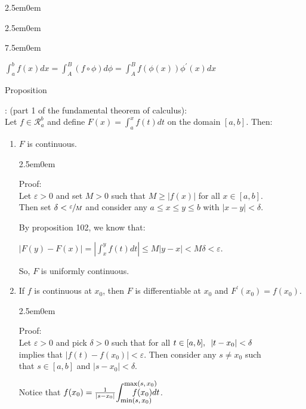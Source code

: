 \documentclass{book}
\newcommand{\hThree}{%
   \color{PineGreen!85!Orange}
   \fontsize{13}{15}\selectfont%
}
\newenvironment{myIndent}{%
   \begin{adjustwidth}{2.5em}{0em}%
}{%
   \end{adjustwidth}%
}
\newenvironment{myTindent}{%
   \begin{adjustwidth}{7.5em}{0em}%
}{%
   \end{adjustwidth}%
}
\newcommand{\myHS}{ \hspace{0.5em}}
\newcounter{PropNumber}
\newcommand{\propCount}[1][1]{%
   \addtocounter{PropNumber}{#1}%
   \thePropNumber%
}
\newcommand{\retTwo}{\hfill\bigbreak}
\begin{document}
{\begin{myIndent}
{\begin{myIndent}
{\begin{myTindent}
         {\centering $\int_a^bf(x)dx = \int_A^B(f \circ \phi)d\phi = \int_A^B f(\phi(x))\phi^\prime(x)dx$ \retTwo\par}
      \end{myTindent}}
   \end{myIndent}}

   Proposition \propCount: (part 1 of the fundamental theorem of calculus):\\
   Let $f \in \mathscr{R}_a^b$ and define $F(x) = \int_a^xf(t)dt$ on the domain $[a, b]$. Then:
   \begin{enumerate}
      \item $F$ is continuous.
      
      {\begin{myIndent}\hThree
         Proof:\\
         Let $\varepsilon > 0$ and set $M > 0$ such that $M \geq |f(x)|$ for all $x \in [a, b]$.\\ Then set $\delta < \sfrac{\varepsilon}{M}$ and consider any $a \leq x \leq y \leq b$ with $|x - y| < \delta$.\retTwo

         By proposition 102, we know that:
         
         {\centering$|F(y) - F(x)| = |\int_x^yf(t)dt| \leq M|y-x| < M\delta < \varepsilon$.
         \retTwo\par}

         So, $F$ is uniformly continuous.
         \retTwo
      \end{myIndent}}

      \item If $f$ is continuous at $x_0$, then $F$ is differentiable at $x_0$ and $F^\prime(x_0) = f(x_0)$.
      
      {\begin{myIndent}\hThree
         Proof:\\
         Let $\varepsilon > 0$ and pick $\delta > 0$ such that for all $t \in [a, b], \myHS |t - x_0| < \delta$\\ implies that  $|f(t) - f(x_0)| < \varepsilon$. Then consider any $s \neq x_0$ such\\ that $s \in [a, b]$ and $|s - x_0| < \delta$.\retTwo

         Notice that $f(x_0) = \frac{1}{|s - x_0|}{\displaystyle\int_{\text{\footnotesize $\min(s, x_0)$}}^{\text{\footnotesize $\max(s, x_0)$}}}{\hspace{-3em} f(x_0)dt}$.

         \newpage


\end{myIndent}}
\end{enumerate}
\end{myIndent}}
\end{document}
